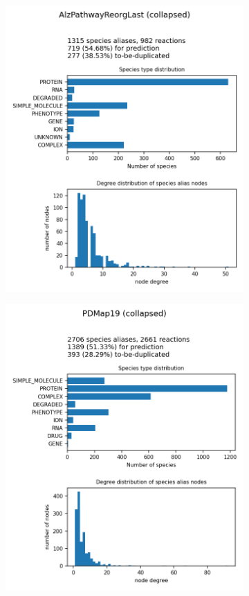 \documentclass[
	fontsize=10pt, %
	twoside=false, %
	secnumdepth=1, %
  toc=indentunnumbered %
]{kaobook}
\begin{document}
\begin{figure}[h]
  \centering
  \begin{subfigure}{0.32\textwidth}
    \includegraphics[width=\linewidth]{generated/AlzPathwayReorgLast.png}
  \end{subfigure} 
  \begin{subfigure}{0.32\textwidth}
    \includegraphics[width=\linewidth]{generated/PDMap19.png}

\end{subfigure}
\end{figure}
\end{document}
